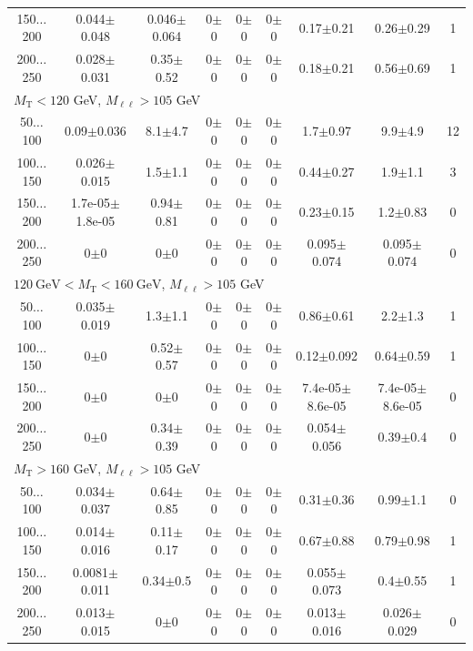 \begin{landscape}
\begin{table}
\begin{center}
\begin{tabular}{| c | c c c c c c  | c  c | }
150$\dots$200&0.044$\pm$0.048&0.046$\pm$0.064&0$\pm$0&0$\pm$0&0$\pm$0&0.17$\pm$0.21&0.26$\pm$0.29&1\\
200$\dots$250&0.028$\pm$0.031&0.35$\pm$0.52&0$\pm$0&0$\pm$0&0$\pm$0&0.18$\pm$0.21&0.56$\pm$0.69&1\\
\hline\hline
\multicolumn{8}{l}{$M_{\text{T}} < 120$ GeV, $M_{\ell\ell} > 105$ GeV}\\\hline\hline
50$\dots$100&0.09$\pm$0.036&8.1$\pm$4.7&0$\pm$0&0$\pm$0&0$\pm$0&1.7$\pm$0.97&9.9$\pm$4.9&12\\
100$\dots$150&0.026$\pm$0.015&1.5$\pm$1.1&0$\pm$0&0$\pm$0&0$\pm$0&0.44$\pm$0.27&1.9$\pm$1.1&3\\
150$\dots$200&1.7e-05$\pm$1.8e-05&0.94$\pm$0.81&0$\pm$0&0$\pm$0&0$\pm$0&0.23$\pm$0.15&1.2$\pm$0.83&0\\
200$\dots$250&0$\pm$0&0$\pm$0&0$\pm$0&0$\pm$0&0$\pm$0&0.095$\pm$0.074&0.095$\pm$0.074&0\\
\hline\hline
\multicolumn{8}{l}{$120~\mathrm{GeV} < M_{\text{T}} < 160~\mathrm{GeV}$, $M_{\ell\ell} > 105$ GeV}\\\hline\hline
50$\dots$100&0.035$\pm$0.019&1.3$\pm$1.1&0$\pm$0&0$\pm$0&0$\pm$0&0.86$\pm$0.61&2.2$\pm$1.3&1\\
100$\dots$150&0$\pm$0&0.52$\pm$0.57&0$\pm$0&0$\pm$0&0$\pm$0&0.12$\pm$0.092&0.64$\pm$0.59&1\\
150$\dots$200&0$\pm$0&0$\pm$0&0$\pm$0&0$\pm$0&0$\pm$0&7.4e-05$\pm$8.6e-05&7.4e-05$\pm$8.6e-05&0\\
200$\dots$250&0$\pm$0&0.34$\pm$0.39&0$\pm$0&0$\pm$0&0$\pm$0&0.054$\pm$0.056&0.39$\pm$0.4&0\\
\hline\hline
\multicolumn{8}{l}{$M_{\text{T}} > 160$ GeV, $M_{\ell\ell} > 105$ GeV}\\\hline\hline
50$\dots$100&0.034$\pm$0.037&0.64$\pm$0.85&0$\pm$0&0$\pm$0&0$\pm$0&0.31$\pm$0.36&0.99$\pm$1.1&0\\
100$\dots$150&0.014$\pm$0.016&0.11$\pm$0.17&0$\pm$0&0$\pm$0&0$\pm$0&0.67$\pm$0.88&0.79$\pm$0.98&1\\
150$\dots$200&0.0081$\pm$0.011&0.34$\pm$0.5&0$\pm$0&0$\pm$0&0$\pm$0&0.055$\pm$0.073&0.4$\pm$0.55&1\\
200$\dots$250&0.013$\pm$0.015&0$\pm$0&0$\pm$0&0$\pm$0&0$\pm$0&0.013$\pm$0.016&0.026$\pm$0.029&0\\
\hline\hline
\end{tabular}
\end{center}
\end{table}

\end{landscape}
